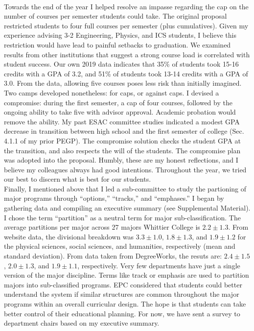 \documentclass[../../../main.tex]{subfiles}
\begin{document}
\\
\vspace{0.25cm}
Towards the end of the year I helped resolve an impasse regarding the cap on the number of courses per semester students could take.  The original proposal restricted students to four full courses per semester (plus cumulatives).  Given my experience advising 3-2 Engineering, Physics, and ICS students, I believe this restriction would have lead to painful setbacks to graduation.  We examined results from other institutions that suggest a strong course load is correlated with student success.  Our own 2019 data indicates that 35\% of students took 15-16 credits with a GPA of 3.2, and 51\% of students took 13-14 credits with a GPA of 3.0.  From the data, allowing five courses poses less risk than initially imagined.  Two camps developed nonetheless: for caps, or against caps.  I devised a compromise: during the first semester, a cap of four courses, followed by the ongoing ability to take five with advisor approval.  Academic probation would remove the ability.  My past ESAC committee studies indicated a modest GPA decrease in transition between high school and the first semester of college (Sec. 4.1.1 of my prior PEGP).  The compromise solution checks the student GPA at the transition, and also respects the will of the students.  The compromise plan was adopted into the proposal.  Humbly, these are my honest reflections, and I believe my colleagues always had good intentions.  Throughout the year, we tried our best to discern what is best for our students.
\\
\vspace{0.25cm}
Finally, I mentioned above that I led a sub-committee to study the partioning of major programs through ``options,'' ``tracks,'' and ``emphases.''  I began by gathering data and compiling an executive summary (see Supplemental Material).  I chose the term ``partition'' as a neutral term for major sub-classification.  The average partitions per major across 27 majors Whittier College is $2.2 \pm 1.3$.  From website data, the divisional breakdown was $3.3 \pm 1.0$, $1.8 \pm 1.3$, and $1.9 \pm 1.2$ for the physical sciences, social sciences, and humanities, respectively (mean and standard deviation).  From data taken from DegreeWorks, the resuts are: $2.4 \pm 1.5$, $2.0 \pm 1.3$, and $1.9 \pm 1.1$, respectively.  Very few departments have just a single version of the major discipline.  Terms like track or emphasis are used to partition majors into sub-classified programs.  EPC considered that students could better understand the system if similar structures are common throughout the major programs within an overall curricular design.  The hope is that students can take better control of their educational planning.  For now, we have sent a survey to department chairs based on my executive summary.
\end{document}
